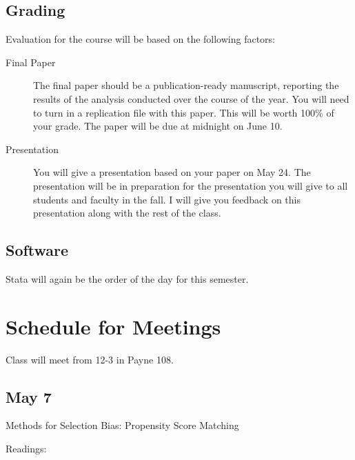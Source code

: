 \documentclass[10pt]{article}
\begin{document}
\subsection{Grading}%
\begin{flushleft}
Evaluation for the course will be based on the following factors:

\begin{description}
\item[Final Paper] The final paper should be a publication-ready
  manuscript, reporting the results of the analysis conducted over the
  course of the year. You will need to turn in a replication file with
  this paper. This will be worth 100\% of your grade. The paper will
  be due at midnight on June 10. 


\item[Presentation] You will give a presentation based on your paper
  on May 24.  The presentation will be in preparation for the
  presentation you will give to all students and faculty in the
  fall. I will give you feedback on this presentation along with the
  rest of the class. 

\end{description}


\end{flushleft}
\subsection{Software}

Stata will again be the order of the day for this semester. 

\section{Schedule for Meetings}

Class will meet from 12-3 in Payne 108.  


\subsection{May 7}


Methods for Selection Bias: Propensity Score Matching

Readings: 
\end{document}
